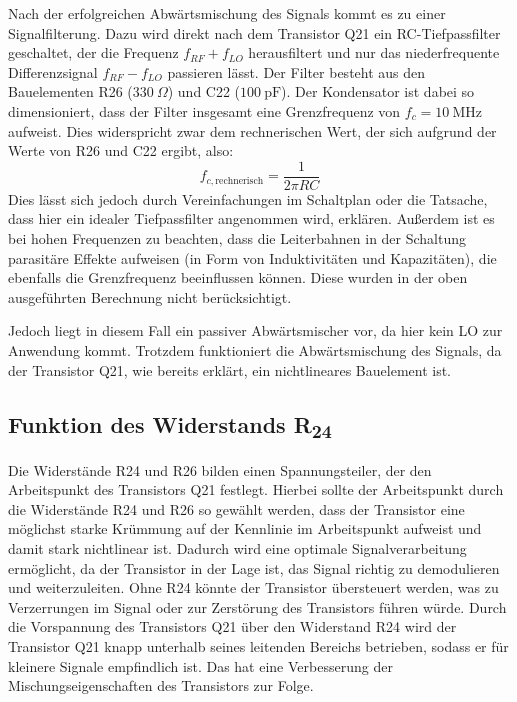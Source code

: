 Nach der erfolgreichen Abwärtsmischung des Signals kommt es zu einer Signalfilterung. Dazu wird direkt nach dem Transistor Q21 ein RC-Tiefpassfilter geschaltet, der die Frequenz $f_{RF} + f_{LO}$ herausfiltert und nur das niederfrequente Differenzsignal $f_{RF} - f_{LO}$ passieren lässt. Der Filter besteht aus den Bauelementen R26 ($330~\Omega$) und C22 ($100~\mathrm{pF}$). Der Kondensator ist dabei so dimensioniert, dass der Filter insgesamt eine Grenzfrequenz von $f_{c} = 10~\mathrm{MHz}$ aufweist. Dies widerspricht zwar dem rechnerischen Wert, der sich aufgrund der Werte von R26 und C22 ergibt, also:
\begin{equation}
    f_{c, \text{rechnerisch}} = \frac{1}{2\pi R C}
\end{equation}
Dies lässt sich jedoch durch Vereinfachungen im Schaltplan oder die Tatsache, dass hier ein idealer Tiefpassfilter angenommen wird, erklären. Außerdem ist es bei hohen Frequenzen zu beachten, dass die Leiterbahnen in der Schaltung parasitäre Effekte aufweisen (in Form von Induktivitäten und Kapazitäten), die ebenfalls die Grenzfrequenz beeinflussen können. Diese wurden in der oben ausgeführten Berechnung nicht berücksichtigt.

Jedoch liegt in diesem Fall ein passiver Abwärtsmischer vor, da hier kein \ac{LO} zur Anwendung kommt. Trotzdem funktioniert die Abwärtsmischung des Signals, da der Transistor Q21, wie bereits erklärt, ein nichtlineares Bauelement ist.

\subsection{Funktion des Widerstands R\textsubscript{24}}
Die Widerstände R24 und R26 bilden einen Spannungsteiler, der den Arbeitspunkt des Transistors Q21 festlegt. Hierbei sollte der Arbeitspunkt durch die Widerstände R24 und R26 so gewählt werden, dass der Transistor eine möglichst starke Krümmung auf der Kennlinie im Arbeitspunkt aufweist und damit stark nichtlinear ist. Dadurch wird eine optimale Signalverarbeitung ermöglicht, da der Transistor in der Lage ist, das Signal richtig zu demodulieren und weiterzuleiten. Ohne R24 könnte der Transistor übersteuert werden, was zu Verzerrungen im Signal oder zur Zerstörung des Transistors führen würde.
Durch die Vorspannung des Transistors Q21 über den Widerstand R24 wird der Transistor Q21 knapp unterhalb seines leitenden Bereichs betrieben, sodass er für kleinere Signale empfindlich ist. Das hat eine Verbesserung der Mischungseigenschaften des Transistors zur Folge.

